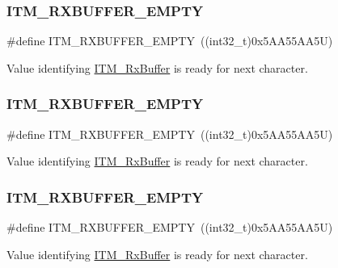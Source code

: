 \subsubsection{\texorpdfstring{ITM\_RXBUFFER\_EMPTY}{ITM\_RXBUFFER\_EMPTY}\hspace{0.1cm}{\footnotesize\ttfamily [3/6]}}
{\footnotesize\ttfamily \#define I\+T\+M\+\_\+\+R\+X\+B\+U\+F\+F\+E\+R\+\_\+\+E\+M\+P\+TY~((int32\+\_\+t)0x5\+A\+A55\+A\+A5\+U)}

Value identifying \mbox{\hyperlink{group___c_m_s_i_s__core___debug_functions_ga12e68e55a7badc271b948d6c7230b2a8}{I\+T\+M\+\_\+\+Rx\+Buffer}} is ready for next character. \mbox{\label{group___c_m_s_i_s__core___debug_functions_gaa822cb398ee022b59e9e6c5d7bbb228a}} 
\subsubsection{\texorpdfstring{ITM\_RXBUFFER\_EMPTY}{ITM\_RXBUFFER\_EMPTY}\hspace{0.1cm}{\footnotesize\ttfamily [4/6]}}
{\footnotesize\ttfamily \#define I\+T\+M\+\_\+\+R\+X\+B\+U\+F\+F\+E\+R\+\_\+\+E\+M\+P\+TY~((int32\+\_\+t)0x5\+A\+A55\+A\+A5\+U)}

Value identifying \mbox{\hyperlink{group___c_m_s_i_s__core___debug_functions_ga12e68e55a7badc271b948d6c7230b2a8}{I\+T\+M\+\_\+\+Rx\+Buffer}} is ready for next character. \mbox{\label{group___c_m_s_i_s__core___debug_functions_gaa822cb398ee022b59e9e6c5d7bbb228a}} 
\subsubsection{\texorpdfstring{ITM\_RXBUFFER\_EMPTY}{ITM\_RXBUFFER\_EMPTY}\hspace{0.1cm}{\footnotesize\ttfamily [5/6]}}
{\footnotesize\ttfamily \#define I\+T\+M\+\_\+\+R\+X\+B\+U\+F\+F\+E\+R\+\_\+\+E\+M\+P\+TY~((int32\+\_\+t)0x5\+A\+A55\+A\+A5\+U)}

Value identifying \mbox{\hyperlink{group___c_m_s_i_s__core___debug_functions_ga12e68e55a7badc271b948d6c7230b2a8}{I\+T\+M\+\_\+\+Rx\+Buffer}} is ready for next character. \mbox{\label{group___c_m_s_i_s__core___debug_functions_gaa822cb398ee022b59e9e6c5d7bbb228a}} 
